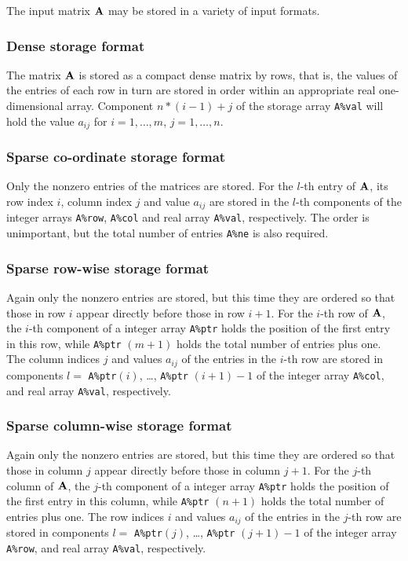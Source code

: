 \documentclass{galahad}
\begin{document}

\galmatrix
The input matrix ${\mathbf{A}}$ may be stored in a variety of input formats.

\subsubsection{Dense storage format}\label{dense}
The matrix ${\mathbf{A}}$ is stored as a compact 
dense matrix by rows, that is, the values of the entries of each row in turn are
stored in order within an appropriate real one-dimensional array.
Component $n \ast (i-1) + j$ of the storage array {\tt A\%val} will hold the 
value $a_{ij}$ for $i = 1, \ldots , m$, $j = 1, \ldots , n$.

\subsubsection{Sparse co-ordinate storage format}\label{coordinate}
Only the nonzero entries of the matrices are stored. For the 
$l$-th entry of ${\mathbf{A}}$, its row index $i$, column index $j$ 
and value $a_{ij}$
are stored in the $l$-th components of the integer arrays {\tt A\%row}, 
{\tt A\%col} and real array {\tt A\%val}, respectively.
The order is unimportant, but the total
number of entries {\tt A\%ne} is also required. 

\subsubsection{Sparse row-wise storage format}\label{rowwise}
Again only the nonzero entries are stored, but this time
they are ordered so that those in row $i$ appear directly before those
in row $i+1$. For the $i$-th row of ${\mathbf{A}}$, the $i$-th component of a 
integer array {\tt A\%ptr} holds the position of the first entry in this row,
while {\tt A\%ptr} $(m+1)$ holds the total number of entries plus one.
The column indices $j$ and values $a_{ij}$ of the entries in the $i$-th row 
are stored in components 
$l =$ {\tt A\%ptr}$(i)$, \ldots , {\tt A\%ptr} $(i+1)-1$ of the 
integer array {\tt A\%col}, and real array {\tt A\%val}, respectively. 

\subsubsection{Sparse column-wise storage format}\label{colwise}
Again only the nonzero entries are stored, but this time
they are ordered so that those in column $j$ appear directly before those
in column $j+1$. For the $j$-th column of ${\mathbf{A}}$, the $j$-th component of a 
integer array {\tt A\%ptr} holds the position of the first entry in this column,
while {\tt A\%ptr} $(n+1)$ holds the total number of entries plus one.
The row indices $i$ and values $a_{ij}$ of the entries in the $j$-th row 
are stored in components 
$l =$ {\tt A\%ptr}$(j)$, \ldots , {\tt A\%ptr} $(j+1)-1$ of the 
integer array {\tt A\%row}, and real array {\tt A\%val}, respectively. 
\end{document}
